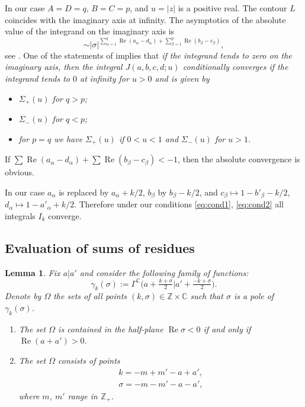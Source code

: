 \documentclass[pdftex]{sigma}
\numberwithin{equation}{section}
\newtheorem{Lemma}[Theorem]{Lemma}
\renewcommand{\Re}{\mathop {\mathrm {Re}}\nolimits}
\renewcommand{\Re}{\mathop {\mathrm {Re}}\nolimits}
\def\C {{\mathbb C }}
\def\Z{{\mathbb Z}}
\begin{document}
In our case $A=D=q$, $B=C=p$, and $u=|z|$ is a positive real.
The contour $L$ coincides with the imaginary axis at infinity.
The asymptotics of the absolute value of the integrand on the imaginary axis
is
\[
\sim |\sigma|^{\sum\limits_{\alpha=1}^q\Re (a_\alpha-d_\alpha)+\sum\limits_{\beta=1}^p\Re(b_\beta- c_\beta)},
\]
see \cite[equation~(1.18(4))]{HTF1}.
One of the statements of \cite[Theorem~18]{Mar} implies that
\emph{if the integrand tends to zero on the imaginary axis,
then the integral $J(a,b,c,d;u)$ conditionally converges if
the integrand tends to $0$ at infinity for $u>0$ and is given by}
\begin{itemize}\itemsep=0pt
\item[--] \textit{$\Sigma_+(u)$ for $q>p$;}
\item[--] \textit{$\Sigma_-(u)$ for $q<p$;}
\item[--] \textit{for $p=q$ we have $\Sigma_+(u)$ if $0<u<1$ and $\Sigma_-(u)$ for $u>1$.}
\end{itemize}
If
$\sum\Re(a_\alpha-d_\alpha)+\sum\Re(b_\beta-c_\beta)<-1$,
then the absolute convergence is obvious.

In our case $a_\alpha$ is replaced by $a_\alpha+k/2$, $b_\beta$ by
$b_\beta-k/2$, and $c_\beta\mapsto 1-b'_\beta-k/2$,
$d_\alpha\mapsto 1-a'_\alpha+k/2$.
Therefore under our conditions \eqref{eq:cond1}, \eqref{eq:cond2}
all integrals $I_k$ converge.

\subsection{Evaluation of sums of residues}\label{ss:evaluation}

\begin{Lemma}
Fix $a|a'$ and consider the following family of functions:
\[
\gamma_k(\sigma):=\Gamma^\C\big(a+\tfrac {k+\sigma}2\big|a'+\tfrac
{-k+\sigma}2\big).
\]
Denote by $\Omega$ the sets of all points $(k,\sigma)\in \Z\times \C$
such that $\sigma$ is a pole of $\gamma_k(\sigma)$.
\begin{enumerate}\itemsep=0pt
\item[$(a)$] The set $\Omega$ is contained in the half-plane $\Re\sigma<0$ if and only
if $\Re(a+a')>0$.
\item[$(b)$] The set $\Omega$ consists of points
\begin{gather*}
k=-m+m'-a+a', \\
\sigma= -m-m'-a-a',
\end{gather*}
where $m$, $m'$ range in $\Z_+$.
\end{enumerate}
\end{Lemma}
\end{document}
